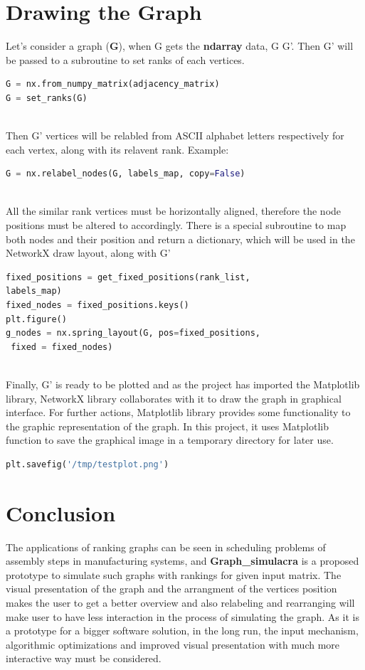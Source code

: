 \documentclass[11pt]{article}
\begin{document}
\section{Drawing the Graph}
Let's consider a graph \big(\textbf{G}), when G gets the \textbf{ndarray} data, G \textrightarrow G'. Then G' will be passed to a subroutine to set ranks of each vertices. \\
\begin{lstlisting}[language=Python]
G = nx.from_numpy_matrix(adjacency_matrix)
G = set_ranks(G)
\end{lstlisting} 
\noindent
\\Then G' vertices will be relabled from ASCII alphabet letters respectively for each vertex, along with its relavent rank. Example: \big[\textbf{a:1}]\\
\begin{lstlisting}[language=Python]
G = nx.relabel_nodes(G, labels_map, copy=False)
\end{lstlisting}
\noindent
\\All the similar rank vertices must be horizontally aligned, therefore the node positions must be altered to accordingly. There is a special subroutine to map both nodes and their position and return a dictionary, which will be used in the NetworkX draw layout, along with G'\\
\begin{lstlisting}[language=Python]
fixed_positions = get_fixed_positions(rank_list, 
labels_map)
fixed_nodes = fixed_positions.keys()
plt.figure()
g_nodes = nx.spring_layout(G, pos=fixed_positions,
 fixed = fixed_nodes)
\end{lstlisting} 
\noindent
\\Finally, G' is ready to be plotted and as the project has imported the Matplotlib library, NetworkX library collaborates with it to draw the graph in graphical interface. For further actions, Matplotlib library provides some functionality to the graphic representation of the graph. In this project, it uses Matplotlib function to save the graphical image in a temporary directory for later use.
\begin{lstlisting}[language=Python]
plt.savefig('/tmp/testplot.png')
\end{lstlisting}
\pagebreak
\section{Conclusion}
The applications of ranking graphs can be seen in scheduling problems of assembly steps in manufacturing systems, and \textbf{Graph\_simulacra} is a proposed prototype to simulate such graphs with rankings for given input matrix. The visual presentation of the graph and the arrangment of the vertices position makes the user to get a better overview and also relabeling and rearranging will make user to have less interaction in the process of simulating the graph. As it is a prototype for a bigger software solution, in the long run, the input mechanism, algorithmic optimizations and improved visual presentation with much more interactive way must be considered.
\end{document}
